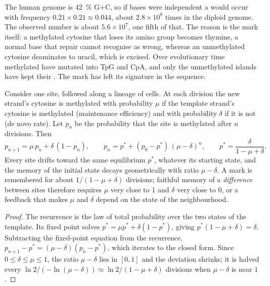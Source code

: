\begin{example}\label{ex:b3:chromatin-epigenetics:cpg-deficit}
The human genome is \qty{42}{\%} G$+$C, so if bases were independent a
 would occur with frequency $0.21\times 0.21 \approx 0.044$, about
$2.8\times 10^{8}$ times in the diploid genome. The observed number is
about $5.6\times 10^{7}$, one fifth of that. The reason is the mark
itself: a methylated cytosine that loses its amino group becomes
thymine, a normal base that repair cannot recognise as wrong, whereas
an unmethylated cytosine deaminates to uracil, which is excised. Over
evolutionary time methylated  have mutated into TpG and CpA, and
only the unmethylated islands have kept their . The mark has left
its signature in the sequence.
\end{example}

\begin{theorem}\label{thm:b3:chromatin-epigenetics:maintenance}
Consider one  site, followed along a lineage of cells. At each
division the new strand's cytosine is methylated with probability
$\mu$ if the template strand's cytosine is methylated (maintenance
efficiency) and with probability $\delta$ if it is not (de novo rate).
Let $p_{n}$ be the probability that the site is methylated after $n$
divisions. Then
\[
p_{n+1} = \mu\, p_{n} + \delta\,(1 - p_{n}),
\qquad
p_{n} = p^{*} + (p_{0} - p^{*})\,(\mu - \delta)^{n},
\qquad
p^{*} = \frac{\delta}{1 - \mu + \delta}.
\]
Every site drifts toward the same equilibrium $p^{*}$, whatever its
starting state, and the memory of the initial state decays
geometrically with ratio $\mu - \delta$. A mark is remembered for
about $1/(1 - \mu + \delta)$ divisions; faithful memory of a
\emph{difference} between sites therefore requires $\mu$ very close to
$1$ and $\delta$ very close to $0$, or a feedback that makes $\mu$ and
$\delta$ depend on the state of the neighbourhood.
\end{theorem}
\begin{proof}
The recurrence is the law of total probability over the two states of
the template. Its fixed point solves $p^{*} = \mu p^{*} + \delta(1 -
p^{*})$, giving $p^{*}(1 - \mu + \delta) = \delta$. Subtracting the
fixed-point equation from the recurrence, $p_{n+1} - p^{*} = (\mu -
\delta)(p_{n} - p^{*})$, which iterates to the closed form. Since
$0 \le \delta \le \mu \le 1$, the ratio $\mu - \delta$ lies in $[0,1]$
and the deviation shrinks; it is halved every $\ln 2 / (-\ln(\mu -
\delta)) \approx \ln 2/(1 - \mu + \delta)$ divisions when $\mu -
\delta$ is near $1$.
\end{proof}

